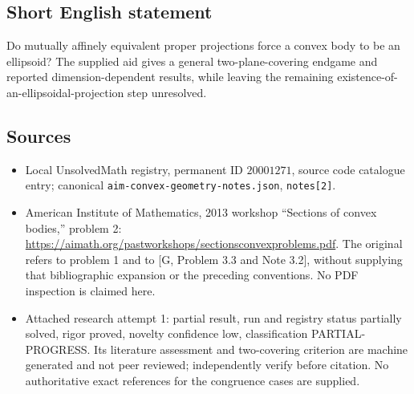 \documentclass[11pt]{article}
\begin{document}
\subsection{Short English statement}
Do mutually affinely equivalent proper projections force a convex body to be an ellipsoid? The supplied aid gives a general two-plane-covering endgame and reported dimension-dependent results, while leaving the remaining existence-of-an-ellipsoidal-projection step unresolved.
\subsection{Sources}
\begin{itemize}
\item Local UnsolvedMath registry, permanent ID $20001271$, source code catalogue entry; canonical \texttt{aim-convex-geometry-notes.json}, \texttt{notes[2]}.
\item American Institute of Mathematics, 2013 workshop ``Sections of convex bodies,'' problem 2: \url{https://aimath.org/pastworkshops/sectionsconvexproblems.pdf}. The original refers to problem 1 and to [G, Problem 3.3 and Note 3.2], without supplying that bibliographic expansion or the preceding conventions. No PDF inspection is claimed here.
\item Attached research attempt 1: partial result, run and registry status partially solved, rigor proved, novelty confidence low, classification PARTIAL-PROGRESS. Its literature assessment and two-covering criterion are machine generated and not peer reviewed; independently verify before citation. No authoritative exact references for the congruence cases are supplied.
\end{itemize}
\end{document}
